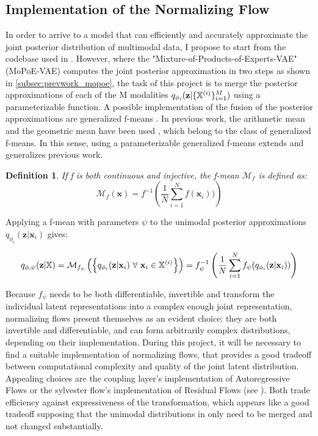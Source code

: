 \documentclass[english]{scrartcl}
\newtheorem{definition}{Definition}
\begin{document}
    \subsection{Implementation of the Normalizing Flow}
    In order to arrive to a model that can efficiently and accurately approximate the joint posterior distribution of multimodal data, I propose to start from the codebase used in \citet{sutter_generalized_2020}.
    However, where the "Mixture-of-Products-of-Experts-VAE" (MoPoE-VAE) computes the joint posterior approximation in two steps as shown in \cref{subsec:prevwork_mopoe}, the task of this project is to merge the posterior approximations of each of the M modalities $q_{\phi_i}(\textbf{z}|\{\mathbb{X}^{(i)}\}_{i=1}^M)$ using a parameterizable function.
    A possible implementation of the fusion of the posterior approximations are generalized f-means \citep{niculescu_convex_2018}.
    In previous work, the arithmetic mean and the geometric mean have been used  \citep[PoE,MoE,MoPoE]{wu_multimodal_2018,shi_variational_2019,sutter_generalized_2020}, which belong to the class of generalized f-means.
    In this sense, using a parameterizable generalized f-means extends and generalizes previous work.
    \begin{definition}
        If f is both continuous and injective, the f-mean $\mathcal{M}_f$ is defined as:
        \begin{equation}
             \mathcal{M}_{f}\left( \textbf{x} \right) = f^{-1}\left( \frac{1}{N} \sum ^N _{i=1} f(\textbf{x}_i)) \right)
        \end{equation}
    \end{definition}

    Applying a f-mean with parameters $\psi$ to the unimodal posterior approximations $q_{\phi _i}(\textbf{z}|\textbf{x}_i)$ gives:

    \begin{equation}\label{eq:merge_function}
        q_{\phi, \psi}(\textbf{z} | \mathbb{X}) = \mathcal{M}_{f_{\psi}}\left( \left\{ q_{\phi _i}(\textbf{z}|\textbf{x}_i)\ \forall\ \textbf{x}_i \in \mathbb{X}^{(i)} \right\} \right) = f_{\psi}^{-1}\left( \frac{1}{N} \sum ^N _{i=1} f_{\psi}(q_{\phi _i}(\textbf{z}|\textbf{x}_i)) \right)
    \end{equation}

    Because $f_{\psi}$ needs to be both differentiable, invertible and transform the individual latent representations into a complex enough joint representation, normalizing flows present themselves as an evident choice:
    they are both invertible and differentiable, and can form arbitrarily complex distributions, depending on their implementation.
    During this project, it will be necessary to find a suitable implementation of normalizing flows, that provides a good tradeoff between computational complexity and quality of the joint latent distribution.
    Appealing choices are the coupling layer's implementation of Autoregressive Flows or the sylvester flow's implementation of Residual Flows (see ).
    Both trade efficiency against expressiveness of the transformation, which appears like a good tradeoff supposing that the unimodal distributions in  only need to be merged and not changed substantially.
\end{document}
